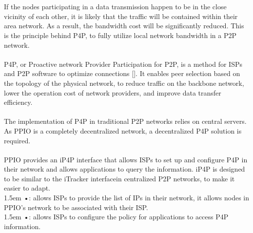 \documentclass[10pt,a4paper]{article}
\newcommand\hl{\bgroup\markoverwith
  {\textcolor{lightgray}{\rule[-.5ex]{.1pt}{2.5ex}}}\ULon}
\begin{document}
 \vspace{-0.5em}
 \\ \\If the nodes participating in a data transmission happen to be in the close vicinity of each other, it is likely that the traffic will be contained within their area network. As a result, the bandwidth cost will be significantly reduced. This is the principle behind P4P, to fully utilize local network bandwidth in a P2P network.  
 \vspace{-0.5em}
  \\ \\ P4P, or Proactive network Provider Participation for P2P\cite{article17}, is a method for ISPs and P2P software to optimize connections []. It enables peer selection based on the topology of the physical network, to reduce traffic on the backbone network, lower the operation cost of network providers, and improve data transfer efficiency. 
  \vspace{-0.5em}
  \\ \\The implementation of P4P in traditional P2P networks relies on central servers. As PPIO is a completely decentralized network, a decentralized P4P solution is required.
  \vspace{-0.5em}
    \\ \\PPIO provides an iP4P interface that allows ISPs to set up and configure P4P in their network and allows applications to query the information. iP4P is designed to be similar to the iTracker interface\cite{article17}in centralized P2P networks, to make it easier to adapt.
    \vspace{-0.8em}
\\

\hangindent 1.5em
\noindent   
•: allows ISPs to provide the list of IPs in their network, it allows nodes in PPIO’s network to be associated with their ISP.
\vspace{-0.8em}                                                      %
\\

\hangindent 1.5em
\noindent   
•: allows ISPs to configure the policy for applications to access P4P information.
\vspace{-0.8em}
\\
\end{document}
